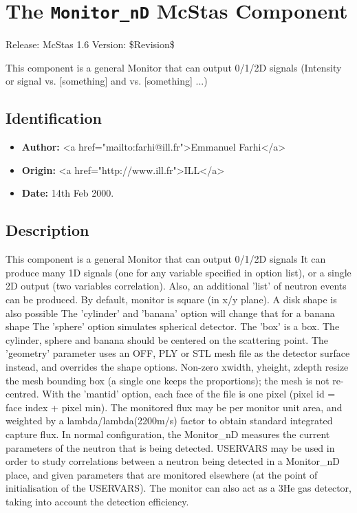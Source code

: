 \section{The \texttt{Monitor\_nD} McStas Component}
Release: McStas 1.6
Version: \$Revision\$

This component is a general Monitor that can output 0/1/2D signals
(Intensity or signal vs. [something] and vs. [something] ...)

\subsection*{Identification}
\begin{itemize}
  \item \textbf{Author:} \textless{}a href="mailto:farhi@ill.fr"\textgreater{}Emmanuel Farhi\textless{}/a\textgreater{}
  \item \textbf{Origin:} \textless{}a href="http://www.ill.fr"\textgreater{}ILL\textless{}/a\textgreater{}
  \item \textbf{Date:} 14th Feb 2000.
\end{itemize}

\subsection*{Description}
This component is a general Monitor that can output 0/1/2D signals It can produce many 1D signals (one for any variable specified in option list), or a single 2D output (two variables correlation). Also, an additional 'list' of neutron events can be produced. By default, monitor is square (in x/y plane). A disk shape is also possible The 'cylinder' and 'banana' option will change that for a banana shape The 'sphere' option simulates spherical detector. The 'box' is a box. The cylinder, sphere and banana should be centered on the scattering point. The 'geometry' parameter uses an OFF, PLY or STL mesh file as the detector surface instead, and overrides the shape options. Non-zero xwidth, yheight, zdepth resize the mesh bounding box (a single one keeps the proportions); the mesh is not re-centred. With the 'mantid' option, each face of the file is one pixel (pixel id = face index + pixel min). The monitored flux may be per monitor unit area, and weighted by a lambda/lambda(2200m/s) factor to obtain standard integrated capture flux. In normal configuration, the Monitor\_nD measures the current parameters of the neutron that is being detected. USERVARS may be used in order to study correlations between a neutron being detected in a Monitor\_nD place, and given parameters that are monitored elsewhere (at the point of initialisation of the USERVARS). The monitor can also act as a 3He gas detector, taking into account the detection efficiency.

